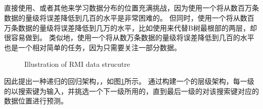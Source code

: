 \subsection{{\rmi}}
\label{sec:rmi}

直接使用{\lr}、{\nn}或者其他{\model}来学习数据分布的位置充满挑战，因为使用一个{\model}将从数百万条数据的量级将误差降低到几百的水平是非常困难的。
但同时，使用一个{\model}将从数百万条数据的量级将误差降低到几万的水平，比如使用{\model}来代替B树最根部的两层，却很容易做到。
类似地，使用一个{\model}将从数万条数据的量级将误差降低到几百的水平也是一个相对简单的任务，因为{\model}只需要关注一部分数据。


\begin{figure}[!htp]
  \centering
    {Illustration of RMI data strucutre}
  \label{fig:rmi}
\end{figure}

因此{\li}提出一种递归的回归架构，{\rmi}，如图\ref{fig:rmi}所示。
通过构建一个{\model}的层级架构，每一级的{\model}以搜索键为输入，并挑选一个下一级所用的{\model}，直到最后一级的{\model}对该搜索键对应的数据位置进行预测。


